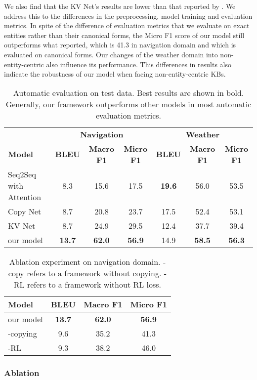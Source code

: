 \documentclass[11pt]{article}
\begin{document}
We also find that the KV Net's results are lower than that reported by .
	We address this to the differences in the preprocessing, model training and evaluation metrics. 
	In spite of the difference of evaluation metrics that we evaluate on exact entities rather than their canonical forms, the Micro F1 score of our model still outperforms what  reported, which is 41.3 in navigation domain and which is evaluated on canonical forms.
	Our changes of the weather domain into non-entity-centric also influence its performance.
	This differences in results also indicate the robustness of our model when facing non-entity-centric KBs.
\begin{table}
	\centering
	\begin{tabular}{l|ccc|ccc}
		&\multicolumn{3}{c|}{\textbf{Navigation}}&\multicolumn{3}{c}{\textbf{Weather}}\\
		\textbf{Model}&\textbf{BLEU}&\textbf{Macro F1}&\textbf{Micro F1}&\textbf{BLEU}&\textbf{Macro F1}&\textbf{Micro F1}\\\hline
		Seq2Seq with Attention&8.3&15.6&17.5&\textbf{19.6}&56.0&53.5\\
		Copy Net &8.7&20.8&23.7&17.5&52.4&53.1\\
		KV Net &8.7&24.9&29.5&12.4&37.7&39.4\\
		our model&\textbf{13.7}&\textbf{62.0}&\textbf{56.9}&14.9&\textbf{58.5}&\textbf{56.3}\\
	\end{tabular}
	\caption{Automatic evaluation on test data. Best results are shown in bold. Generally, our framework outperforms other models in most automatic evaluation metrics. }
	\label{table2}
\end{table}
\begin{table}[!tp]
	\centering
	\begin{tabular}{l|ccc}
		\textbf{Model}&\textbf{BLEU}&\textbf{Macro F1}&\textbf{Micro F1}\\\hline
		our model&\textbf{13.7}&\textbf{62.0}&\textbf{56.9}\\
-copying&9.6&35.2&41.3\\
		-RL&9.3&38.2&46.0\\
	\end{tabular}
	\caption{Ablation experiment on navigation domain. 
		-copy refers to a framework without copying. -RL refers to a framework without RL loss.}
	\label{table3}
\end{table}
\subsubsection{Ablation}
\end{document}
